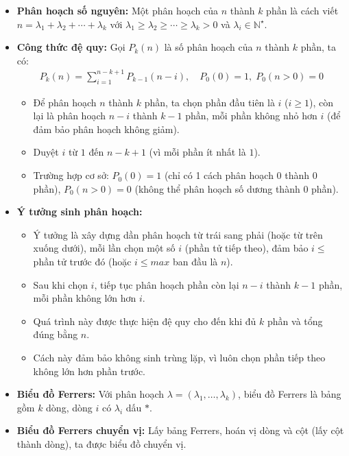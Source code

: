 \documentclass{article}
\begin{document}
\begin{itemize}
    \item \textbf{Phân hoạch số nguyên:} Một phân hoạch của $n$ thành $k$ phần là cách viết $n = \lambda_1 + \lambda_2 + \cdots + \lambda_k$ với $\lambda_1 \geq \lambda_2 \geq \cdots \geq \lambda_k > 0$ và $\lambda_i \in \mathbb{N}^\star$.
    \item \textbf{Công thức đệ quy:} Gọi $P_k(n)$ là số phân hoạch của $n$ thành $k$ phần, ta có:
    \begin{align*}
        P_k(n) = \sum_{i=1}^{n-k+1} P_{k-1}(n-i), \quad P_0(0) = 1, \; P_0(n>0) = 0
    \end{align*}
    \begin{itemize}
        \item Để phân hoạch $n$ thành $k$ phần, ta chọn phần đầu tiên là $i$ ($i \geq 1$), còn lại là phân hoạch $n-i$ thành $k-1$ phần, mỗi phần không nhỏ hơn $i$ (để đảm bảo phân hoạch không giảm).
        \item Duyệt $i$ từ $1$ đến $n-k+1$ (vì mỗi phần ít nhất là $1$).
        \item Trường hợp cơ sở: $P_0(0) = 1$ (chỉ có 1 cách phân hoạch 0 thành 0 phần), $P_0(n>0) = 0$ (không thể phân hoạch số dương thành 0 phần).
    \end{itemize}
    \item \textbf{Ý tưởng sinh phân hoạch:}
    \begin{itemize}
        \item Ý tưởng là xây dựng dần phân hoạch từ trái sang phải (hoặc từ trên xuống dưới), mỗi lần chọn một số $i$ (phần tử tiếp theo), đảm bảo $i \leq$ phần tử trước đó (hoặc $i \leq max$ ban đầu là $n$).
        \item Sau khi chọn $i$, tiếp tục phân hoạch phần còn lại $n-i$ thành $k-1$ phần, mỗi phần không lớn hơn $i$.
        \item Quá trình này được thực hiện đệ quy cho đến khi đủ $k$ phần và tổng đúng bằng $n$.
        \item Cách này đảm bảo không sinh trùng lặp, vì luôn chọn phần tiếp theo không lớn hơn phần trước.
    \end{itemize}
    \item \textbf{Biểu đồ Ferrers:} Với phân hoạch $\lambda = (\lambda_1,\ldots,\lambda_k)$, biểu đồ Ferrers là bảng gồm $k$ dòng, dòng $i$ có $\lambda_i$ dấu $*$.
    \item \textbf{Biểu đồ Ferrers chuyển vị:} Lấy bảng Ferrers, hoán vị dòng và cột (lấy cột thành dòng), ta được biểu đồ chuyển vị.
\end{itemize}
\end{document}
